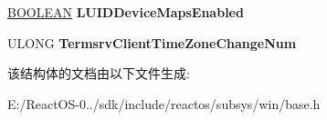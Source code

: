 \begin{DoxyCompactItemize}
\item 
\mbox{\label{struct___b_a_s_e___s_t_a_t_i_c___s_e_r_v_e_r___d_a_t_a_a08697ad4939b6acd70f1b9b9fe654c47}} 
\hyperlink{_processor_bind_8h_a112e3146cb38b6ee95e64d85842e380a}{B\+O\+O\+L\+E\+AN} {\bfseries L\+U\+I\+D\+Device\+Maps\+Enabled}
\item 
\mbox{\label{struct___b_a_s_e___s_t_a_t_i_c___s_e_r_v_e_r___d_a_t_a_a1b0e47401a8168bf70c9ba4fbedf99dd}} 
U\+L\+O\+NG {\bfseries Termsrv\+Client\+Time\+Zone\+Change\+Num}
\end{DoxyCompactItemize}


该结构体的文档由以下文件生成\+:\begin{DoxyCompactItemize}
\item 
E\+:/\+React\+O\+S-\/0../sdk/include/reactos/subsys/win/base.\+h\end{DoxyCompactItemize}
